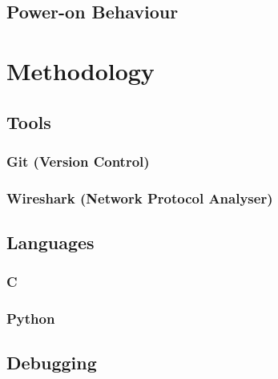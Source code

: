 		\subsection{Power-on Behaviour}
	
	\section{Methodology}
		
		\subsection{Tools}
			
			\subsubsection{Git (Version Control)}
			
			\subsubsection{Wireshark (Network Protocol Analyser)}
		
		\subsection{Languages}
			
			\subsubsection{C}
			
			\subsubsection{Python}
		
		\subsection{Debugging}
